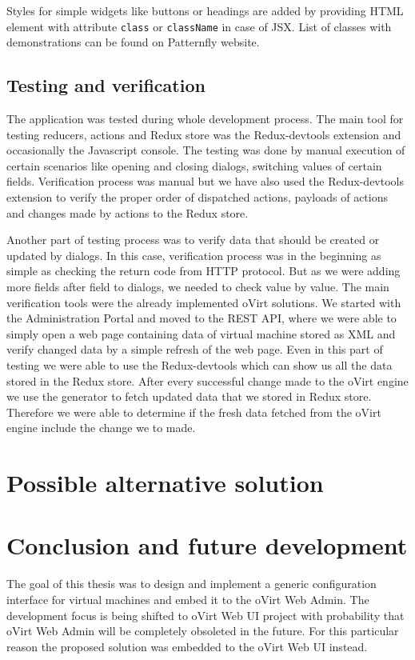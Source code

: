 Styles for simple widgets like buttons or headings are added by providing HTML element with attribute \texttt{class} or \texttt{className} in case of JSX. List of classes with demonstrations can be found on Patternfly website\cite{Patternfly}. 

\section{Testing and verification}
The application was tested during whole development process. The main tool for testing reducers, actions and Redux store was the Redux-devtools extension and occasionally the Javascript console. The testing was done by manual execution of certain scenarios like opening and closing dialogs, switching values of certain fields. Verification process was manual but we have also used the Redux-devtools extension to verify the proper order of dispatched actions, payloads of actions and changes made by actions to the Redux store.

Another part of testing process was to verify data that should be created or updated by dialogs. In this case, verification process was in the beginning as simple as checking the return code from HTTP protocol. But as we were adding more fields after field to dialogs, we needed to check value by value. The main verification tools were the already implemented oVirt solutions. We started with the Administration Portal and moved  to the REST API, where we were able to simply open a web page containing data of virtual machine stored as XML and verify changed data by a simple refresh of the web page. Even in this part of testing we were able to use the Redux-devtools which can show us all the data stored in the Redux store. After every successful change made to the oVirt engine we use the generator to fetch updated data that we stored in Redux store. Therefore we were able to determine if the fresh data fetched from the oVirt engine include the change we to made.


\chapter{Possible alternative solution}

\chapter{Conclusion and future development}
The goal of this thesis was to design and implement a generic configuration interface for virtual machines and embed it to the oVirt Web Admin. The development focus is being shifted to oVirt Web UI project with probability that oVirt Web Admin will be completely obsoleted in the future. For this particular reason the proposed solution was embedded to the oVirt Web UI instead.

